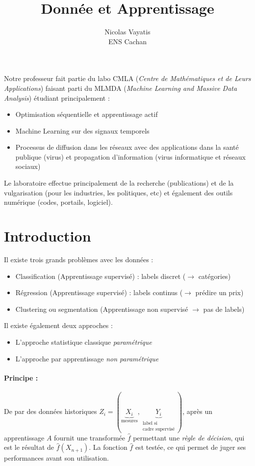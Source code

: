 \documentclass{article}
\title{Donnée et Apprentissage}
\author{Nicolas Vayatis\\
ENS Cachan}
\date{}
\begin{document}
\maketitle
\tableofcontents
\newpage


Notre professeur fait partie du labo CMLA (\emph{Centre de Mathématiques et de Leurs Applications}) faisant parti du MLMDA (\emph{Machine Learning and Massive Data Analysis}) étudiant principalement :
\begin{itemize}
\item Optimisation séquentielle et apprentissage actif
\item Machine Learning sur des signaux temporels
\item Processus de diffusion dans les réseaux avec des applications dans la santé publique (virus) et propagation d'information (virus informatique et réseaux sociaux)
\end{itemize}

Le laboratoire effectue principalement de la recherche (publications) et de la vulgarisation (pour les industries, les politiques, etc) et également des outils numérique (codes, portails, logiciel).
\bigskip

\section{Introduction}
Il existe trois grands problèmes avec les données :
\begin{itemize}
\item Classification (Apprentissage supervisé) : labels discret ($\to$ catégories)
\item Régression (Apprentissage supervisé) : labels continus ($\to$ prédire un prix)
\item Clustering ou segmentation (Apprentissage non supervisé $\to$ pas de labels)
\end{itemize}

Il existe également deux approches :
\begin{itemize}
\item L'approche statistique classique \emph{paramétrique}
\item L'approche par apprentissage \emph{non paramétrique}
\end{itemize}

\paragraph{Principe :}
De par des données historiques $Z_i = (\underbrace{X_i}_{\text{mesures}},\underbrace{Y_i}_{\substack{\text{label si}\\\text{cadre supervisé}}})$, après un apprentissage $A$ fournit une transformée $\hat{f}$ permettant une \emph{règle de décision}, qui est le résultat de $\hat{f}(X_{n+1})$. La fonction $\hat{f}$ est testée, ce qui permet de juger ses performances avant son utilisation.
\bigskip
\end{document}
